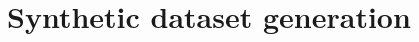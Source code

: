 \documentclass[10pt,aspectratio=169]{beamer} %
\begin{document}
%
%	
\section{Synthetic dataset generation}
\end{document}
